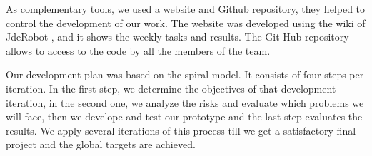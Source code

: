 As complementary tools, we used a website and Github repository, they helped to control the development of our work. The website was developed using the wiki of JdeRobot \cite{wikiPieras}, and it shows the weekly tasks and results. The Git Hub repository \cite{repoPieras} allows to access to the code by all the members of the team.

Our development plan was based on the spiral model. It consists of four steps per iteration. In the first step, we determine the objectives of that development iteration, in the second one, we analyze the risks and evaluate which problems we will face, then we develope and test our prototype and the last step evaluates the results. We apply several iterations of this process till we get a satisfactory final project and the global targets are achieved.
































